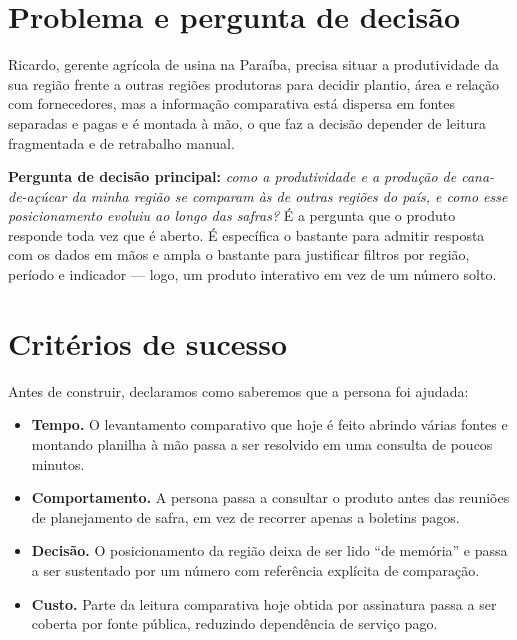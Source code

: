 \documentclass[11pt,a4paper]{article}
\begin{document}
\section{Problema e pergunta de decisão}

\begin{caixadestaque}
Ricardo, gerente agrícola de usina na Paraíba, precisa situar a produtividade da sua região
frente a outras regiões produtoras para decidir plantio, área e relação com fornecedores, mas
a informação comparativa está dispersa em fontes separadas e pagas e é montada à mão, o que
faz a decisão depender de leitura fragmentada e de retrabalho manual.
\end{caixadestaque}

\textbf{Pergunta de decisão principal:} \textit{como a produtividade e a produção de
cana-de-açúcar da minha região se comparam às de outras regiões do país, e como esse
posicionamento evoluiu ao longo das safras?} É a pergunta que o produto responde toda vez que
é aberto. É específica o bastante para admitir resposta com os dados em mãos e ampla o
bastante para justificar filtros por região, período e indicador — logo, um produto
interativo em vez de um número solto.

\section{Critérios de sucesso}

Antes de construir, declaramos como saberemos que a persona foi ajudada:

\begin{itemize}
  \item \textbf{Tempo.} O levantamento comparativo que hoje é feito abrindo várias fontes e
  montando planilha à mão passa a ser resolvido em uma consulta de poucos minutos.
  \item \textbf{Comportamento.} A persona passa a consultar o produto antes das reuniões de
  planejamento de safra, em vez de recorrer apenas a boletins pagos.
  \item \textbf{Decisão.} O posicionamento da região deixa de ser lido ``de memória'' e passa
  a ser sustentado por um número com referência explícita de comparação.
  \item \textbf{Custo.} Parte da leitura comparativa hoje obtida por assinatura passa a ser
  coberta por fonte pública, reduzindo dependência de serviço pago.
\end{itemize}
\end{document}
